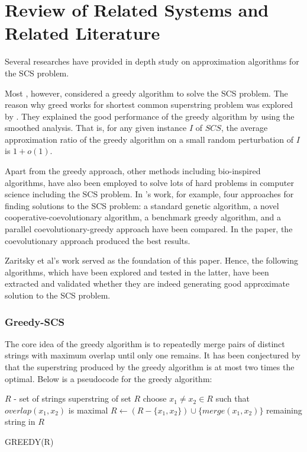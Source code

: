 \chapter{Review of Related Systems and Related Literature}

Several researches have provided in depth study on approximation
algorithms for the SCS problem.

Most \cite{Turner1989, Ma2009, Zaritsky2004}, however, considered a greedy algorithm to solve the SCS problem.
The reason why greed works for shortest common superstring problem was
explored by \cite{Ma2009}. They explained the good performance 
of the greedy algorithm by using the smoothed analysis. 
That is, for any  given instance $I$ of $SCS$, 
the average approximation ratio of the 
greedy algorithm on a small random perturbation of $I$ is $1+o(1)$. 

Apart from the greedy approach, other methods including bio-inspired
algorithms, have also been employed to solve lots of hard problems in 
computer science including the SCS problem. 
In \cite{Zaritsky2004}'s work, for example, four approaches for 
finding solutions to the SCS problem: a 
standard genetic algorithm, a novel cooperative-coevolutionary 
algorithm, a benchmark greedy algorithm, and a parallel 
coevolutionary-greedy approach have been compared. In the paper,
the coevolutionary approach produced the best results.

Zaritsky et al's \cite{Zaritsky2004} work served as the 
foundation of this paper. Hence, the following algorithms,
which have been explored and tested in the latter, have
been extracted and validated 
whether they are indeed generating
good approximate solution to the SCS problem.

\subsection{Greedy-SCS}

The core idea of the greedy algorithm is to repeatedly merge
 pairs of distinct strings with maximum overlap until only one remains.
 It has been conjectured by \cite{MaierStorer1777} that the superstring
 produced by the greedy algorithm is at most two times the optimal.
Below is a pseudocode for the greedy algorithm:

\begin{algorithm}[H]
	\begin{algorithmic}[1]
	\REQUIRE $R$ - set of strings
	\ENSURE superstring of set $R$
		\STATE choose $x_1 \neq x_2 \in R$ such that $overlap(x_1,x_2)$ is maximal 
		\STATE $R \leftarrow (R - \{x_1, x_2\}) \cup \{merge(x_1, x_2)\}$
	\ENDWHILE
	\RETURN remaining string in $R$
	\end{algorithmic}
	\caption{GREEDY(R)}
	\label{alg:seq}
\end{algorithm}

